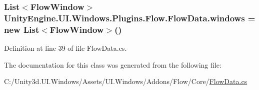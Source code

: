 \subsubsection[{windows}]{\setlength{\rightskip}{0pt plus 5cm}List$<${\bf Flow\+Window}$>$ Unity\+Engine.\+U\+I.\+Windows.\+Plugins.\+Flow.\+Flow\+Data.\+windows = new List$<${\bf Flow\+Window}$>$()}\label{class_unity_engine_1_1_u_i_1_1_windows_1_1_plugins_1_1_flow_1_1_flow_data_a22d28d9797622aa121040fb69909dfa6}


Definition at line 39 of file Flow\+Data.\+cs.



The documentation for this class was generated from the following file\+:\begin{DoxyCompactItemize}
\item 
C\+:/\+Unity3d.\+U\+I.\+Windows/\+Assets/\+U\+I.\+Windows/\+Addons/\+Flow/\+Core/\hyperlink{_flow_data_8cs}{Flow\+Data.\+cs}\end{DoxyCompactItemize}
